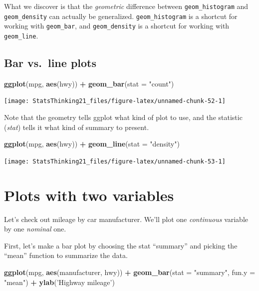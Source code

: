 \documentclass[12pt,]{book}
\newenvironment{Shaded}{\begin{snugshade}}{\end{snugshade}}
\newcommand{\DataTypeTok}[1]{\textcolor[rgb]{0.13,0.29,0.53}{#1}}
\newcommand{\KeywordTok}[1]{\textcolor[rgb]{0.13,0.29,0.53}{\textbf{#1}}}
\newcommand{\NormalTok}[1]{#1}
\newcommand{\OperatorTok}[1]{\textcolor[rgb]{0.81,0.36,0.00}{\textbf{#1}}}
\newcommand{\StringTok}[1]{\textcolor[rgb]{0.31,0.60,0.02}{#1}}
\begin{document}
What we discover is that the \emph{geometric} difference between \texttt{geom\_histogram} and \texttt{geom\_density} can actually be generalized. \texttt{geom\_histogram} is a shortcut for working with \texttt{geom\_bar}, and \texttt{geom\_density} is a shortcut for working with \texttt{geom\_line}.

\hypertarget{bar-vs.line-plots}{%
\subsection{Bar vs.~line plots}\label{bar-vs.line-plots}}

\begin{Shaded}
\begin{Highlighting}[]
\KeywordTok{ggplot}\NormalTok{(mpg, }\KeywordTok{aes}\NormalTok{(hwy)) }\OperatorTok{+}
\StringTok{  }\KeywordTok{geom_bar}\NormalTok{(}\DataTypeTok{stat =} \StringTok{"count"}\NormalTok{)}
\end{Highlighting}
\end{Shaded}

\texttt{[image: StatsThinking21\_files/figure-latex/unnamed-chunk-52-1]}

Note that the geometry tells ggplot what kind of plot to use, and the statistic (\emph{stat}) tells it what kind of summary to present.

\begin{Shaded}
\begin{Highlighting}[]
\KeywordTok{ggplot}\NormalTok{(mpg, }\KeywordTok{aes}\NormalTok{(hwy)) }\OperatorTok{+}
\StringTok{  }\KeywordTok{geom_line}\NormalTok{(}\DataTypeTok{stat =} \StringTok{"density"}\NormalTok{)}
\end{Highlighting}
\end{Shaded}

\texttt{[image: StatsThinking21\_files/figure-latex/unnamed-chunk-53-1]}

\hypertarget{plots-with-two-variables}{%
\section{Plots with two variables}\label{plots-with-two-variables}}

Let's check out mileage by car manufacturer. We'll plot one \emph{continuous} variable by one \emph{nominal} one.

First, let's make a bar plot by choosing the stat ``summary'' and picking the ``mean'' function to summarize the data.

\begin{Shaded}
\begin{Highlighting}[]
\KeywordTok{ggplot}\NormalTok{(mpg, }\KeywordTok{aes}\NormalTok{(manufacturer, hwy)) }\OperatorTok{+}
\StringTok{  }\KeywordTok{geom_bar}\NormalTok{(}\DataTypeTok{stat =} \StringTok{"summary"}\NormalTok{, }\DataTypeTok{fun.y =} \StringTok{"mean"}\NormalTok{)  }\OperatorTok{+}\StringTok{ }
\StringTok{  }\KeywordTok{ylab}\NormalTok{(}\StringTok{'Highway mileage'}\NormalTok{)}
\end{Highlighting}
\end{Shaded}
\end{document}
